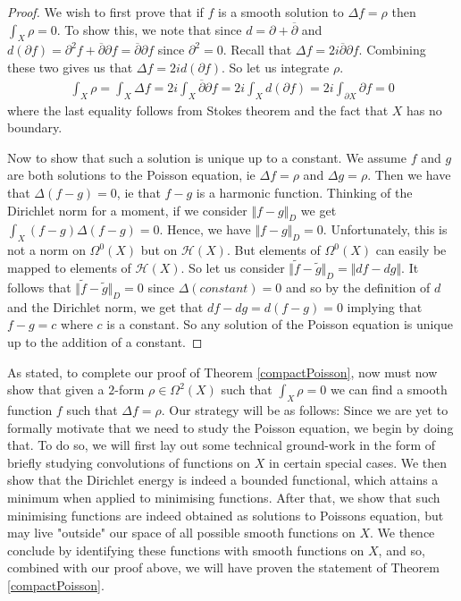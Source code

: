\documentclass[11pt]{report}
\theoremstyle{definition}
\begin{document}
\begin{proof}
  We wish to first prove that if $f$ is a smooth solution to $\Delta f = \rho$ then $\int_X \rho = 0$. To show this, we note that since $d = \partial + \overline{\partial}$ and $d(\partial f) = \partial^2 f + \overline{\partial}\partial f = \overline{\partial}\partial f$ since $\partial^2 = 0$. Recall that  $\Delta f = 2i \overline{\partial}\partial f$. Combining these two gives us that $\Delta f =2id(\partial f)$. So let us integrate $\rho$.
  \begin{align*}
    \int_X \rho = \int_X \Delta f = 2i \int_X \overline{\partial}\partial f = 2i \int_X d(\partial f) = 2i\int_{\partial X}\partial f = 0
  \end{align*}
  where the last equality follows from Stokes theorem and the fact that $X$ has no boundary. 

  Now to show that such a solution is unique up to a constant. We assume $f$ and $g$ are both solutions to the Poisson equation, ie $\Delta f = \rho$ and $\Delta g = \rho$. Then we have that $\Delta (f - g) = 0$, ie that $f-g$ is a harmonic function. Thinking of the Dirichlet norm for a moment, if we consider $\Vert f-g\Vert _D$ we get $\int_X (f-g)\Delta(f-g) = 0$. Hence, we have $\Vert f-g\Vert _D = 0$. Unfortunately, this is not a norm on $\Omega^0(X)$ but on $\mathcal{H}(X)$. But elements of $\Omega^0(X)$ can easily be mapped to elements of $\mathcal{H}(X)$. So let us consider $\Vert \tilde{f}-\tilde{g}\Vert _D = \Vert df - dg\Vert $. It follows that $\Vert \tilde{f}-\tilde{g}\Vert _D = 0$ since $\Delta(constant) = 0$ and so by the definition of $d$ and the Dirichlet norm, we get that $ df - dg = d(f-g) = 0$ implying that $f - g = c$ where $c$ is a constant. So any solution of the Poisson equation is unique up to the addition of a constant.
\end{proof} 

As stated, to complete our proof of Theorem \ref{compactPoisson}, now must now show that given a $2$-form $\rho \in \Omega^2(X)$ such that $\int_X \rho = 0$ we can find a smooth function $f$ such that $\Delta f = \rho$. Our strategy will be as follows: Since we are yet to formally motivate that we need to study the Poisson equation, we begin by doing that. To do so, we will first lay out some technical ground-work in the form of briefly studying convolutions of functions on $X$ in certain special cases. We then show that the Dirichlet energy is indeed a bounded functional, which attains a minimum when applied to minimising functions. After that, we show that such minimising functions are indeed obtained as solutions to Poissons equation, but may live "outside" our space of all possible smooth functions on $X$. We thence conclude by identifying these functions with smooth functions on $X$, and so, combined with our proof above, we will have proven the statement of Theorem \ref{compactPoisson}. 
\end{document}
